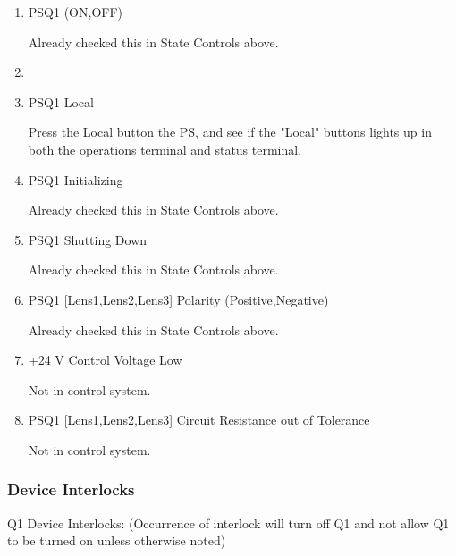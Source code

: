 \documentclass[11pt]{book}		%
\begin{document}
\begin{enumerate}

\item PSQ1 (ON,OFF)

\color{red}
Already checked this in State Controls above.
\color{black}

\item \item PSQ1 Local

\color{red}
Press the Local button the PS, and see if the "Local" buttons lights up in both the operations terminal and status terminal.
\color{black}

\item PSQ1 Initializing

\color{red}
Already checked this in State Controls above.
\color{black}

 \item PSQ1 Shutting Down

\color{red}
Already checked this in State Controls above.
\color{black}

 \item PSQ1 [Lens1,Lens2,Lens3] Polarity (Positive,Negative)

\color{red}
Already checked this in State Controls above.
\color{black}

\item +24 V Control Voltage Low

\color{red}
Not in control system.
\color{black}

\item PSQ1 [Lens1,Lens2,Lens3] Circuit Resistance out of Tolerance

\color{red}
Not in control system.
\color{black}

\end{enumerate}

\subsubsection{Device Interlocks}\label{sect:cyc-equip-ctl-beamline-quad1-state-monitors-device-interlocks}

Q1 Device Interlocks:
(Occurrence of interlock will turn off Q1 and not allow Q1 to be turned on unless otherwise noted)
\end{document}

